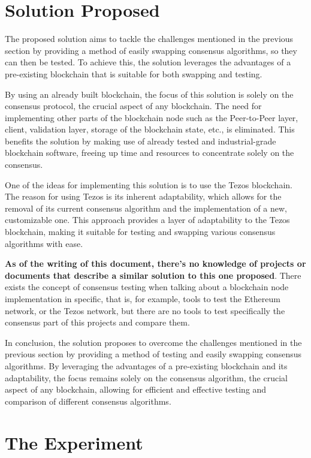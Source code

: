 \section{Solution Proposed}
The proposed solution aims to tackle the challenges mentioned in the previous section by providing a method of easily swapping consensus algorithms, so they can then be tested. To achieve this, the solution leverages the advantages of a pre-existing blockchain that is suitable for both swapping and testing.

By using an already built blockchain, the focus of this solution is solely on the consensus protocol, the crucial aspect of any blockchain. The need for implementing other parts of the blockchain node such as the Peer-to-Peer layer, client, validation layer, storage of the blockchain state, etc., is eliminated. This benefits the solution by making use of already tested and industrial-grade blockchain software, freeing up time and resources to concentrate solely on the consensus.

One of the ideas for implementing this solution is to use the Tezos blockchain. The reason for using Tezos is its inherent adaptability, which allows for the removal of its current consensus algorithm and the implementation of a new, customizable one. This approach provides a layer of adaptability to the Tezos blockchain, making it suitable for testing and swapping various consensus algorithms with ease.

\textbf{As of the writing of this document, there's no knowledge of projects or documents that describe a similar solution to this one proposed}. There exists the concept of consensus testing when talking about a blockchain node implementation in specific, that is, for example, tools to test the Ethereum network, or the Tezos network, but there are no tools to test specifically the consensus part of this projects and compare them.

In conclusion, the solution proposes to overcome the challenges mentioned in the previous section by providing a method of testing and easily swapping consensus algorithms. By leveraging the advantages of a pre-existing blockchain and its adaptability, the focus remains solely on the consensus algorithm, the crucial aspect of any blockchain, allowing for efficient and effective testing and comparison of different consensus algorithms.


\section{The Experiment}


